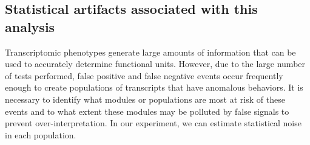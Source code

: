 \documentclass[10pt, twocolumn]{article}
\begin{document}
\subsection*{Statistical artifacts associated with this analysis}
Transcriptomic phenotypes generate large amounts of information that can be used
to accurately determine functional units. However, due to the large number
of tests performed, false positive and false negative events occur frequently
enough to create populations of transcripts that have anomalous behaviors. It is
necessary to identify what modules or populations are most at risk of these
events and to what extent these modules may be polluted by false signals to
prevent over-interpretation. In our experiment, we can estimate statistical noise
in each population.

%
\end{document}
